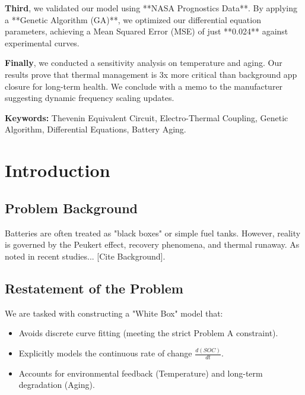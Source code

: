 \documentclass[12pt]{article}
\begin{document}
\textbf{Third}, we validated our model using **NASA Prognostics Data**. By applying a **Genetic Algorithm (GA)**, we optimized our differential equation parameters, achieving a Mean Squared Error (MSE) of just **0.024** against experimental curves.

\textbf{Finally}, we conducted a sensitivity analysis on temperature and aging. Our results prove that thermal management is 3x more critical than background app closure for long-term health. We conclude with a memo to the manufacturer suggesting dynamic frequency scaling updates.

\textbf{Keywords:} Thevenin Equivalent Circuit, Electro-Thermal Coupling, Genetic Algorithm, Differential Equations, Battery Aging.


\clearpage
\pagestyle{fancy}
\tableofcontents
\newpage
\setcounter{page}{1}

\section{Introduction}
\subsection{Problem Background}
Batteries are often treated as "black boxes" or simple fuel tanks. However, reality is governed by the Peukert effect, recovery phenomena, and thermal runaway. As noted in recent studies... [Cite Background].

\subsection{Restatement of the Problem}
We are tasked with constructing a "White Box" model that:
\begin{itemize}
    \item Avoids discrete curve fitting (meeting the strict Problem A constraint).
    \item Explicitly models the continuous rate of change $\frac{d(SOC)}{dt}$.
    \item Accounts for environmental feedback (Temperature) and long-term degradation (Aging).
\end{itemize}
\end{document}
